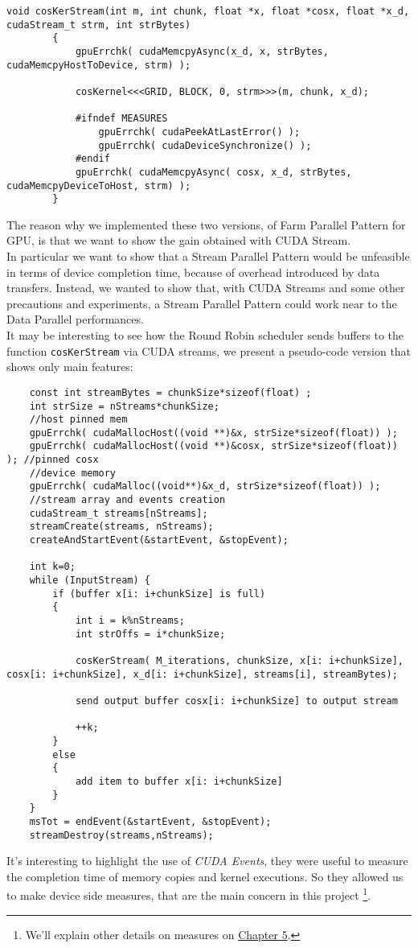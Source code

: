 \begin{itemize}
		\begin{lstlisting}[label=lst:str]
		void cosKerStream(int m, int chunk, float *x, float *cosx, float *x_d, cudaStream_t strm, int strBytes)
		{     
			gpuErrchk( cudaMemcpyAsync(x_d, x, strBytes, cudaMemcpyHostToDevice, strm) ); 
			
			cosKernel<<<GRID, BLOCK, 0, strm>>>(m, chunk, x_d);
			
			#ifndef MEASURES
				gpuErrchk( cudaPeekAtLastError() );
				gpuErrchk( cudaDeviceSynchronize() );
			#endif   
			gpuErrchk( cudaMemcpyAsync( cosx, x_d, strBytes, cudaMemcpyDeviceToHost, strm) );
		}
		\end{lstlisting}
		
	\end{itemize}
	The reason why we implemented these two versions, of Farm Parallel Pattern for GPU, is that we want to show the gain obtained with CUDA Stream.\\
	In particular we want to show that a Stream Parallel Pattern would be unfeasible in terms of device completion time, because of overhead introduced by data transfers. Instead, we wanted to show that, with CUDA Streams and some other precautions and experiments, a Stream Parallel Pattern could work near to the Data Parallel performances.\\
	
	It may be interesting to see how the Round Robin scheduler sends buffers to the function \texttt{cosKerStream} via CUDA streams, we present a pseudo-code version that shows only main features:
	\begin{lstlisting}
	const int streamBytes = chunkSize*sizeof(float) ;
	int strSize = nStreams*chunkSize;	
	//host pinned mem
	gpuErrchk( cudaMallocHost((void **)&x, strSize*sizeof(float)) ); 
	gpuErrchk( cudaMallocHost((void **)&cosx, strSize*sizeof(float)) ); //pinned cosx
	//device memory	
	gpuErrchk( cudaMalloc((void**)&x_d, strSize*sizeof(float)) );
	//stream array and events creation 
	cudaStream_t streams[nStreams];
	streamCreate(streams, nStreams);
	createAndStartEvent(&startEvent, &stopEvent);
	
	int k=0;
	while (InputStream) {  
		if (buffer x[i: i+chunkSize] is full)
		{
			int i = k%nStreams;
			int strOffs = i*chunkSize;
			
			cosKerStream( M_iterations, chunkSize, x[i: i+chunkSize], cosx[i: i+chunkSize], x_d[i: i+chunkSize], streams[i], streamBytes);     
			   
			send output buffer cosx[i: i+chunkSize] to output stream
			
			++k;
		}
		else
		{
			add item to buffer x[i: i+chunkSize]
		}	
	} 
	msTot = endEvent(&startEvent, &stopEvent);
	streamDestroy(streams,nStreams); 	
	\end{lstlisting}
	It's interesting to highlight the use of \textit{CUDA Events}, they were useful to measure the completion time of memory copies and kernel executions. So they allowed us to make device side measures, that are the main concern in this project \footnote{We'll explain other details on measures on \hyperref[chap:experim]{Chapter 5}.}.
	
